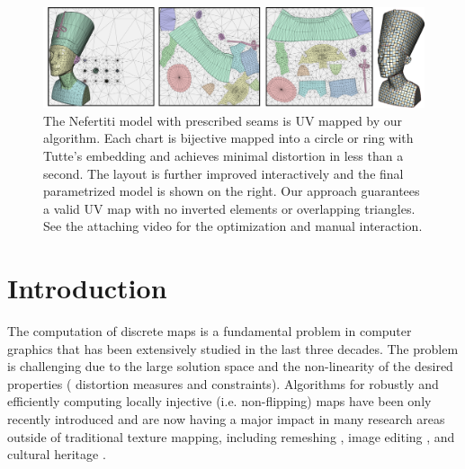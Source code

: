 \begin{figure}
  \center
 \includegraphics[width=\textwidth]{scaf-tex/figs/teaser}
 \caption{The Nefertiti model with prescribed seams is UV mapped by our algorithm. Each chart is bijective mapped into a circle or ring with Tutte's embedding and achieves minimal distortion in less than a second. The layout is further improved interactively and the final parametrized model is shown on the right. Our approach guarantees a valid UV map with no inverted elements or overlapping triangles. See the attaching video for the optimization and manual interaction.
}
 \label{scaf:fig:teaser}
\end{figure}

\section{Introduction}

The computation of discrete maps is a fundamental problem in computer graphics that has been extensively studied in the last three decades. The problem is challenging due to the large solution space
and the non-linearity of the desired properties ( distortion measures and constraints). Algorithms for robustly and efficiently computing locally injective (i.e. non-flipping) maps have been only recently introduced \cite{Lipman:2012,Kovalsky:2016,rabinovich2017scalable} and are now having a major impact in many research areas outside of traditional texture mapping, including remeshing \cite{Bommes:2013}, image editing \cite{Poranne:2014}, and cultural heritage \cite{Pal:2014}.

